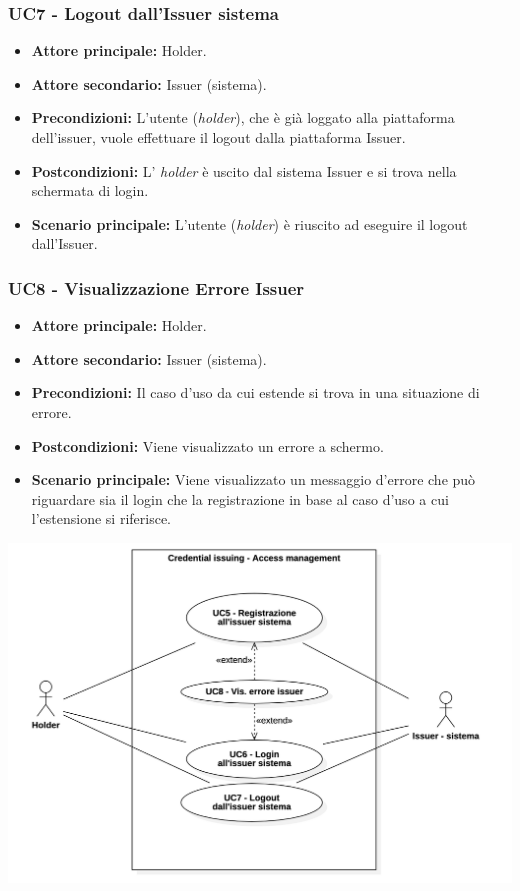 \subsubsection{UC7 - Logout dall'Issuer sistema}
\begin{itemize}
\item \textbf{Attore principale:} Holder.
\item \textbf{Attore secondario:} Issuer (sistema).
\item \textbf{Precondizioni:} L'utente (\textit{holder}), che è già loggato alla piattaforma dell'issuer,  vuole effettuare il logout dalla piattaforma Issuer.
\item \textbf{Postcondizioni:} L' \textit{holder} è uscito dal sistema Issuer e si trova nella schermata di login.
\item \textbf{Scenario principale:} L'utente (\textit{holder}) è riuscito ad eseguire il logout dall'Issuer. 
\end{itemize}

\subsubsection{UC8 - Visualizzazione Errore Issuer}
\begin{itemize}
\item \textbf{Attore principale:} Holder.
\item \textbf{Attore secondario:} Issuer (sistema).
\item \textbf{Precondizioni:} Il caso d'uso da cui estende si trova in una situazione di errore.
\item \textbf{Postcondizioni:} Viene visualizzato un errore a schermo. 
\item \textbf{Scenario principale:} Viene visualizzato un messaggio d’errore che può riguardare sia il login che la registrazione in base al caso d’uso a cui l’estensione si riferisce.
\end{itemize}

\begin{center}
    \includegraphics[scale = 0.3]{./res/img/Credential issuing_access.png}
  \end{center}

